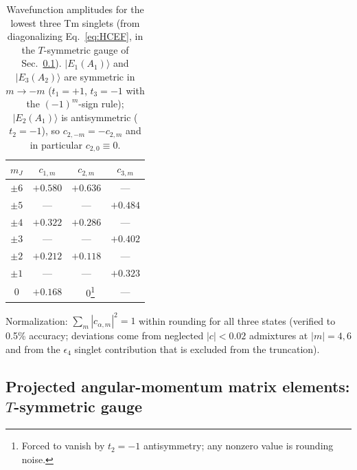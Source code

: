 \documentclass[reprint,amsmath,amssymb,aps,prb,longbibliography]{revtex4-2}
\begin{document}
\begin{table}[t]
\caption{Wavefunction amplitudes for the lowest three Tm singlets (from
diagonalizing Eq.~\eqref{eq:HCEF}, in the $T$-symmetric gauge of
Sec.~\ref{sec:Tgauge}). $|E_1(A_1)\rangle$ and $|E_3(A_2)\rangle$ are
symmetric in $m\to-m$ ($t_1=+1$, $t_3=-1$ with the $(-1)^m$-sign rule);
$|E_2(A_1)\rangle$ is antisymmetric ($t_2=-1$), so $c_{2,-m}=-c_{2,m}$
and in particular $c_{2,0}\equiv 0$.}
\label{tab:CFwfs}
\begin{ruledtabular}
\begin{tabular}{c|ccc}
$m_J$ & $c_{1,m}$ & $c_{2,m}$ & $c_{3,m}$ \\
\hline
$\pm 6$ & $+0.580$ & $+0.636$ & ---     \\
$\pm 5$ & ---      & ---      & $+0.484$ \\
$\pm 4$ & $+0.322$ & $+0.286$ & ---     \\
$\pm 3$ & ---      & ---      & $+0.402$ \\
$\pm 2$ & $+0.212$ & $+0.118$ & ---     \\
$\pm 1$ & ---      & ---      & $+0.323$ \\
$0$     & $+0.168$ & $\;\;\;0$\footnote{Forced to vanish by $t_2=-1$ antisymmetry; any nonzero value is rounding noise.} & ---     \\
\end{tabular}
\end{ruledtabular}
\end{table}

Normalization: $\sum_m |c_{\alpha,m}|^2 = 1$ within rounding for all
three states (verified to 0.5\% accuracy; deviations come from neglected
$|c|<0.02$ admixtures at $|m|=4,6$ and from the $\epsilon_4$ singlet
contribution that is excluded from the truncation).

\subsection{Projected angular-momentum matrix elements: \texorpdfstring{$T$}{T}-symmetric gauge}
\label{sec:Tgauge}
\end{document}
